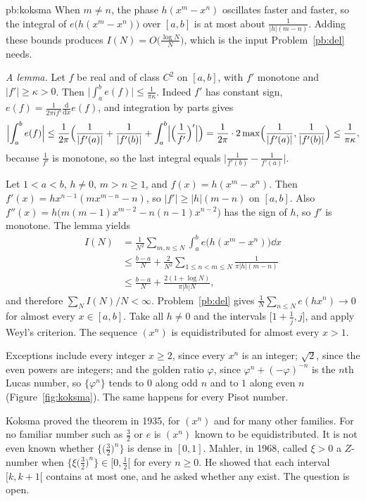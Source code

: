\begin{solution}{pb:koksma}
\idea When $m\ne n$, the phase $h(x^m-x^n)$ oscillates faster and faster, so the integral of $e\bigl(h(x^m-x^n)\bigr)$ over $[a,b]$ is at most about $\frac1{|h|(m-n)}$. Adding these bounds produces $I(N)=O\bigl(\frac{\log N}N\bigr)$, which is the input Problem~\ref{pb:del} needs.

\writeup \emph{A lemma.} Let $f$ be real and of class $C^2$ on $[a,b]$, with $f'$ monotone and $|f'|\ge\kappa>0$. Then $\bigl|\int_a^b e(f)\bigr|\le\frac1{\pi\kappa}$. Indeed $f'$ has constant sign, $e(f)=\frac1{2\pi i f'}\frac{\mathrm d}{\mathrm dx}e(f)$, and integration by parts gives
\[
\Bigl|\int_a^be(f)\Bigr|\le\frac1{2\pi}\Bigl(\frac1{|f'(a)|}+\frac1{|f'(b)|}+\int_a^b\Bigl|\Bigl(\frac1{f'}\Bigr)'\Bigr|\Bigr)=\frac1{2\pi}\cdot 2\max\Bigl(\frac1{|f'(a)|},\frac1{|f'(b)|}\Bigr)\le\frac1{\pi\kappa},
\]
because $\frac1{f'}$ is monotone, so the last integral equals $\bigl|\frac1{f'(b)}-\frac1{f'(a)}\bigr|$.

Let $1<a<b$, $h\ne 0$, $m>n\ge 1$, and $f(x)=h(x^m-x^n)$. Then $f'(x)=hx^{n-1}(mx^{m-n}-n)$, so $|f'|\ge|h|(m-n)$ on $[a,b]$. Also $f''(x)=h\bigl(m(m-1)x^{m-2}-n(n-1)x^{n-2}\bigr)$ has the sign of $h$, so $f'$ is monotone. The lemma yields
\[
\begin{aligned}
I(N)&=\frac1{N^2}\sum_{m,n\le N}\int_a^be\bigl(h(x^m-x^n)\bigr)\dd x\\
&\le\frac{b-a}N+\frac2{N^2}\sum_{1\le n<m\le N}\frac1{\pi|h|(m-n)}\\
&\le\frac{b-a}N+\frac{2(1+\log N)}{\pi|h|N},
\end{aligned}
\]
and therefore $\sum_N I(N)/N<\infty$. Problem~\ref{pb:del} gives $\frac1N\sum_{n\le N}e(hx^n)\to 0$ for almost every $x\in[a,b]$. Take all $h\ne 0$ and the intervals $\bigl[1+\frac1j,j\bigr]$, and apply Weyl's criterion. The sequence $(x^n)$ is equidistributed for almost every $x>1$.

Exceptions include every integer $x\ge 2$, since every $x^n$ is an integer; $\sqrt2$, since the even powers are integers; and the golden ratio $\varphi$, since $\varphi^n+(-\varphi)^{-n}$ is the $n$th Lucas number, so $\{\varphi^n\}$ tends to $0$ along odd $n$ and to $1$ along even $n$ (Figure~\ref{fig:koksma}). The same happens for every Pisot number.

\leads Koksma proved the theorem in 1935, for $(x^n)$ and for many other families. For no familiar number such as $\frac32$ or $e$ is $(x^n)$ known to be equidistributed. It is not even known whether $\bigl\{\bigl(\frac32\bigr)^n\bigr\}$ is dense in $[0,1]$. Mahler, in 1968, called $\xi>0$ a $Z$-number when $\bigl\{\xi\bigl(\frac32\bigr)^n\bigr\}\in\bigl[0,\frac12\bigr[$ for every $n\ge 0$. He showed that each interval $[k,k+1[$ contains at most one, and he asked whether any exist. The question is open.
\end{solution}

